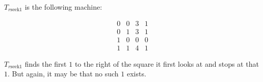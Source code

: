 $T_{r\text{seek}1}$ is the following machine:

$$\begin{array}{cccc}
0 & 0 & 3 & 1 \\
0 & 1 & 3 & 1 \\
1 & 0 & 0 & 0 \\
1 & 1 & 4 & 1
\end{array}$$

$T_{r\text{seek}1}$ finds the first $1$ to the right of the square it first looks at and stops at that $1$. But again, it may be that no such $1$ exists.
